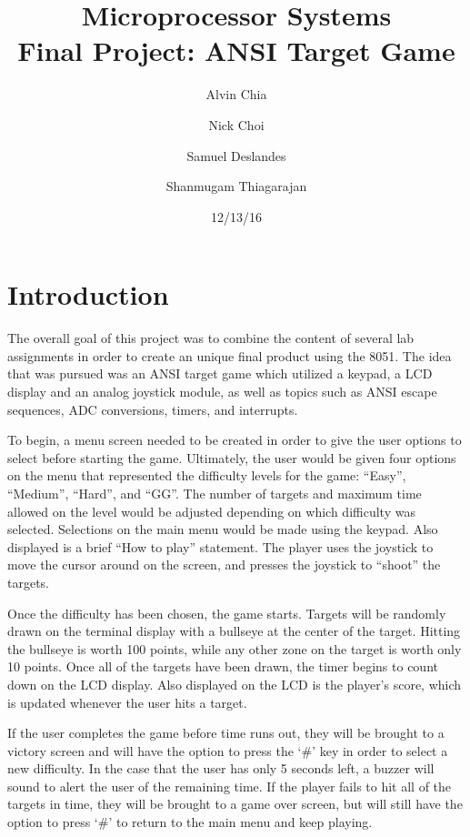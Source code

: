 \documentclass[12pt]{article}
\begin{document}
\title{Microprocessor Systems\\ Final Project: ANSI Target Game}
\author{Alvin Chia \and Nick Choi \and Samuel Deslandes \and Shanmugam Thiagarajan}
\date{12/13/16}
\maketitle
\pagebreak

\section{Introduction}
The overall goal of this project was to combine the content of several lab assignments in order to create an unique final product using the 8051. The idea that was pursued was an ANSI target game which utilized a keypad, a LCD display and an analog joystick module, as well as topics such as ANSI escape sequences, ADC conversions, timers, and interrupts. 

To begin, a menu screen needed to be created in order to give the user options to select before starting the game. Ultimately, the user would be given four options on the menu that represented the difficulty levels for the game: ``Easy'', ``Medium'', ``Hard'', and ``GG''. The number of targets and maximum time allowed on the level would be adjusted depending on which difficulty was selected. Selections on the main menu would be made using the keypad. Also displayed is a brief ``How to play'' statement. The player uses the joystick to move the cursor around on the screen, and presses the joystick to ``shoot'' the targets. 

Once the difficulty has been chosen, the game starts. Targets will be randomly drawn on the terminal display with a bullseye at the center of the target. Hitting the bullseye is worth 100 points, while any other zone on the target is worth only 10 points. Once all of the targets have been drawn, the timer begins to count down on the LCD display. Also displayed on the LCD is the player's score, which is updated whenever the user hits a target. 

If the user completes the game before time runs out, they will be brought to a victory screen and will have the option to press the `\#' key in order to select a new difficulty. In the case that the user has only 5 seconds left, a buzzer will sound to alert the user of the remaining time. If the player fails to hit all of the targets in time, they will be brought to a game over screen, but will still have the option to press `\#' to return to the main menu and keep playing. 
\end{document}
